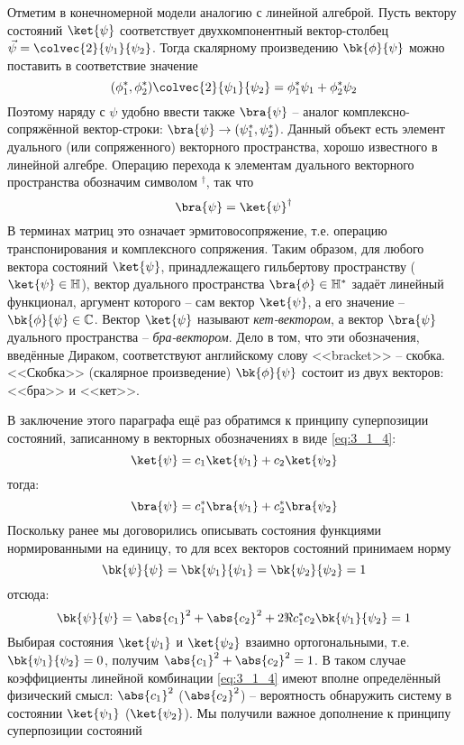Отметим в конечномерной модели аналогию с линейной алгеброй. Пусть вектору состояний $\ket{\psi}$ соответствует двухкомпонентный вектор-столбец $\vec{\psi} = \colvec{2}{\psi_1}{\psi_2}$. Тогда скалярному произведению $\bk{\phi}{\psi}$ можно поставить в соответствие значение%
%
$$
(\phi_1^*, \phi_2^*) \colvec{2}{\psi_1}{\psi_2} = \phi_1^*\psi_1 + \phi_2^* \psi_2
$$%
%
Поэтому наряду с $\psi$ удобно ввести также $\bra{\psi}$ -- аналог комплексно-сопряжённой вектор-строки: $\bra{\psi} \to (\psi_1^*, \psi_2^*)$. Данный объект есть элемент дуального (или сопряженного) векторного пространства, хорошо известного в линейной алгебре. Операцию перехода к элементам дуального векторного пространства обозначим символом $^\dag$, так что%
%
$$
\bra{\psi} = \ket{\psi}^\dag
$$%
%
В терминах матриц это означает эрмитово\footnotemark сопряжение, т.е. операцию транспонирования и комплексного сопряжения. Таким образом, для любого вектора состояний $\ket{\psi}$, принадлежащего гильбертову пространству ($\ket{\psi} \in \mathbb{H}$), вектор дуального пространства $\bra{\phi} \in \mathbb{H}^*$ задаёт линейный функционал, аргумент которого -- сам вектор $\ket{\psi}$, а его значение -- $\bk{\phi}{\psi} \in \mathbb{C}$.
%
Вектор $\ket{\psi}$ называют {\em кет-вектором}, а вектор $\bra{\psi}$ дуального пространства -- {\em бра-вектором}. Дело в том, что эти обозначения, введённые Дираком, соответствуют английскому слову <<bracket>> -- скобка. <<Скобка>> (скалярное произведение) $\bk{\phi}{\psi}$ состоит из двух векторов: <<бра>> и <<кет>>.

В заключение этого параграфа ещё раз обратимся к принципу суперпозиции состояний, записанному в векторных обозначениях в виде \eqref{eq:3_1_4}:%
%
$$
\ket{\psi} = c_1 \ket{\psi_1} + c_2 \ket{\psi_2}
$$%
%
тогда:%
%
$$
\bra{\psi} = c_1^* \bra{\psi_1} + c_2^* \bra{\psi_2}
$$%
%
Поскольку ранее мы договорились описывать состояния функциями нормированными на единицу, то для всех векторов состояний принимаем норму%
%
$$
\bk{\psi}{\psi} = \bk{\psi_1}{\psi_1} = \bk{\psi_2}{\psi_2} = 1
$$%
%
отсюда:%
%
$$
\bk{\psi}{\psi} = \abs{c_1}^2 + \abs{c_2}^2 + 2 \Re{c_1^* c_2 \bk{\psi_1}{\psi_2}} = 1
$$%
%
Выбирая состояния $\ket{\psi_1}$ и $\ket{\psi_2}$ взаимно ортогональными, т.е. $\bk{\psi_1}{\psi_2} = 0$, получим $\abs{c_1}^2 + \abs{c_2}^2 = 1$. В таком случае коэффициенты линейной комбинации \eqref{eq:3_1_4} имеют вполне определённый физический смысл: $\abs{c_1}^2$ ($\abs{c_2}^2$) -- вероятность обнаружить систему в состоянии $\ket{\psi_1}$ ($\ket{\psi_2}$). Мы получили важное дополнение к принципу суперпозиции состояний

